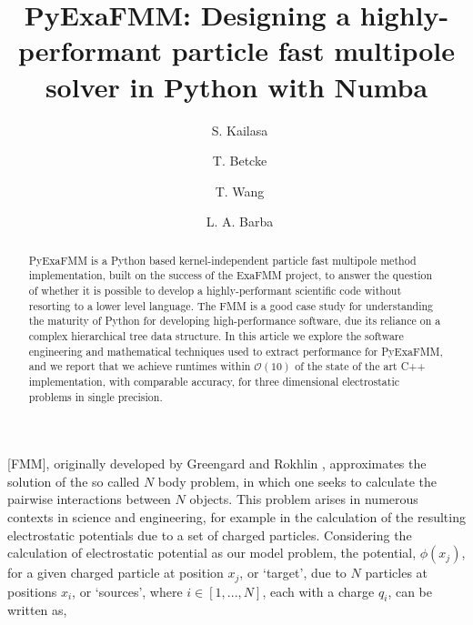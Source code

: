 \documentclass{IEEEcsmag}
\begin{document}

\title{PyExaFMM: Designing a highly-performant particle fast multipole solver in Python with Numba}

\author{\ S. Kailasa}

\author{\ T. Betcke}

\author{\ T. Wang}

\author{\ L. A. Barba}


\begin{abstract}
PyExaFMM is a Python based kernel-independent particle fast multipole method implementation, built on the success of the ExaFMM project, to answer the question of whether it is possible to develop a highly-performant scientific code without resorting to a lower level language. The FMM is a good case study for understanding the maturity of Python for developing high-performance software, due its reliance on a complex hierarchical tree data structure. In this article we explore the software engineering and mathematical techniques used to extract performance for PyExaFMM, and we report that we achieve runtimes within $\mathcal{O}(10)$ of the state of the art C++ implementation, with comparable accuracy, for three dimensional electrostatic problems in single precision.

\end{abstract}

\maketitle

 [FMM], originally developed by Greengard and Rokhlin \cite{Greengard1987}, approximates the solution of the so called $N$ body problem, in which one seeks to calculate the pairwise interactions between $N$ objects. This problem arises in numerous contexts in science and engineering, for example in the calculation of the resulting electrostatic potentials due to a set of charged particles. Considering the calculation of electrostatic potential as our model problem, the potential, $\phi(x_j)$, for a given charged particle at position $x_j$, or `target', due to $N$ particles at positions $x_i$, or `sources', where $i \in [1, ..., N]$, each with a charge $q_i$, can be written as,
\end{document}
